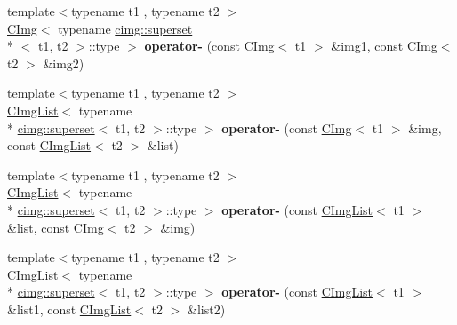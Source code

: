\begin{DoxyCompactItemize}
\item 
\hypertarget{namespacecimg__library_ab084cffd33fb21a1e94e2bdf54a36f4c}{{\footnotesize template$<$typename t1 , typename t2 $>$ }\\\hyperlink{structcimg__library_1_1_c_img}{C\-Img}$<$ typename \hyperlink{structcimg__library_1_1cimg_1_1superset}{cimg\-::superset}\\*
$<$ t1, t2 $>$\-::type $>$ {\bfseries operator-\/} (const \hyperlink{structcimg__library_1_1_c_img}{C\-Img}$<$ t1 $>$ \&img1, const \hyperlink{structcimg__library_1_1_c_img}{C\-Img}$<$ t2 $>$ \&img2)}\label{namespacecimg__library_ab084cffd33fb21a1e94e2bdf54a36f4c}

\item 
\hypertarget{namespacecimg__library_a43d4da379566349a0ced1ae01f6fd627}{{\footnotesize template$<$typename t1 , typename t2 $>$ }\\\hyperlink{structcimg__library_1_1_c_img_list}{C\-Img\-List}$<$ typename \\*
\hyperlink{structcimg__library_1_1cimg_1_1superset}{cimg\-::superset}$<$ t1, t2 $>$\-::type $>$ {\bfseries operator-\/} (const \hyperlink{structcimg__library_1_1_c_img}{C\-Img}$<$ t1 $>$ \&img, const \hyperlink{structcimg__library_1_1_c_img_list}{C\-Img\-List}$<$ t2 $>$ \&list)}\label{namespacecimg__library_a43d4da379566349a0ced1ae01f6fd627}

\item 
\hypertarget{namespacecimg__library_a190d1b8452b752ea029d0134856ce0dc}{{\footnotesize template$<$typename t1 , typename t2 $>$ }\\\hyperlink{structcimg__library_1_1_c_img_list}{C\-Img\-List}$<$ typename \\*
\hyperlink{structcimg__library_1_1cimg_1_1superset}{cimg\-::superset}$<$ t1, t2 $>$\-::type $>$ {\bfseries operator-\/} (const \hyperlink{structcimg__library_1_1_c_img_list}{C\-Img\-List}$<$ t1 $>$ \&list, const \hyperlink{structcimg__library_1_1_c_img}{C\-Img}$<$ t2 $>$ \&img)}\label{namespacecimg__library_a190d1b8452b752ea029d0134856ce0dc}

\item 
\hypertarget{namespacecimg__library_aad482182916ac81f796224c05010ea93}{{\footnotesize template$<$typename t1 , typename t2 $>$ }\\\hyperlink{structcimg__library_1_1_c_img_list}{C\-Img\-List}$<$ typename \\*
\hyperlink{structcimg__library_1_1cimg_1_1superset}{cimg\-::superset}$<$ t1, t2 $>$\-::type $>$ {\bfseries operator-\/} (const \hyperlink{structcimg__library_1_1_c_img_list}{C\-Img\-List}$<$ t1 $>$ \&list1, const \hyperlink{structcimg__library_1_1_c_img_list}{C\-Img\-List}$<$ t2 $>$ \&list2)}\label{namespacecimg__library_aad482182916ac81f796224c05010ea93}


\end{DoxyCompactItemize}
